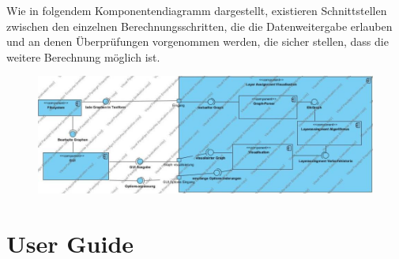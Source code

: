 \documentclass[12pt]{book}
\begin{document}
    Wie in folgendem Komponentendiagramm dargestellt, existieren Schnittstellen zwischen den einzelnen Berechnungsschritten, die die Datenweitergabe erlauben und an denen Überprüfungen vorgenommen werden, die sicher stellen, dass die weitere Berechnung möglich ist.
    
    
    \begin{figure}[ht!]
        \centering
        \includegraphics[width=\textwidth]{images/Component_Diagram1.jpg}
    \end{figure}
    
    
    
    
    
    
    
      
    
    
    
    
    
    
    \section*{User Guide}
    
    
    
    
    

    
    
    
    
    
    
\end{document}

